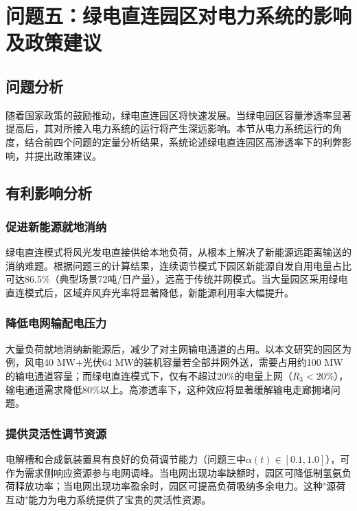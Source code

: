 \section{问题五：绿电直连园区对电力系统的影响及政策建议}

\subsection{问题分析}

随着国家政策的鼓励推动，绿电直连园区将快速发展。当绿电园区容量渗透率显著提高后，其对所接入电力系统的运行将产生深远影响。本节从电力系统运行的角度，结合前四个问题的定量分析结果，系统论述绿电直连园区高渗透率下的利弊影响，并提出政策建议。

\subsection{有利影响分析}

\subsubsection{促进新能源就地消纳}

绿电直连模式将风光发电直接供给本地负荷，从根本上解决了新能源远距离输送的消纳难题。根据问题三的计算结果，连续调节模式下园区新能源自发自用电量占比可达86.5\%（典型场景72吨/日产量），远高于传统并网模式。当大量园区采用绿电直连模式后，区域弃风弃光率将显著降低，新能源利用率大幅提升。

\subsubsection{降低电网输配电压力}

大量负荷就地消纳新能源后，减少了对主网输电通道的占用。以本文研究的园区为例，风电40 MW+光伏64 MW的装机容量若全部并网外送，需要占用约100 MW的输电通道容量；而绿电直连模式下，仅有不超过20\%的电量上网（$R_3 < 20\%$），输电通道需求降低80\%以上。高渗透率下，这种效应将显著缓解输电走廊拥堵问题。

\subsubsection{提供灵活性调节资源}

电解槽和合成氨装置具有良好的负荷调节能力（问题三中$\alpha(t) \in [0.1, 1.0]$），可作为需求侧响应资源参与电网调峰。当电网出现功率缺额时，园区可降低制氢氨负荷释放功率；当电网出现功率盈余时，园区可提高负荷吸纳多余电力。这种"源荷互动"能力为电力系统提供了宝贵的灵活性资源。

